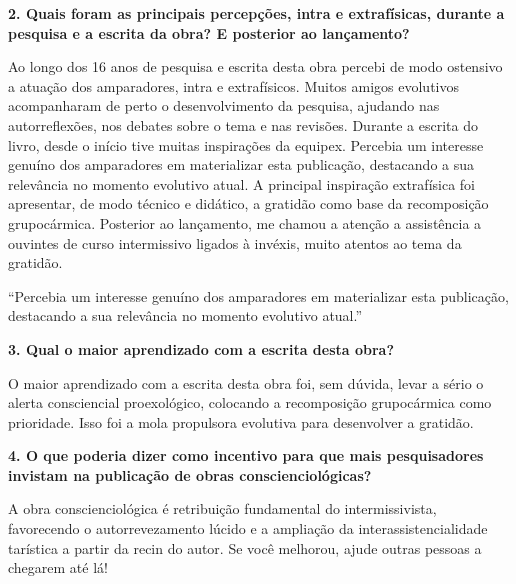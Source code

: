 \documentclass{gescons}
\begin{document}
\begin{multicols}{2}
\textbf{2. Quais foram as principais percepções, intra e extrafísicas, durante a pesquisa e a escrita da obra? E posterior ao lançamento?}

Ao longo dos 16 anos de pesquisa e escrita desta obra percebi de modo ostensivo a atuação dos amparadores, intra e extrafísicos. Muitos amigos evolutivos acompanharam de perto o desenvolvimento da pesquisa, ajudando nas autorreflexões, nos debates sobre o tema e nas revisões. Durante a escrita do livro, desde o início tive muitas inspirações da equipex. Percebia um interesse genuíno dos amparadores em materializar esta publicação, destacando a sua relevância no momento evolutivo atual. A principal inspiração extrafísica foi apresentar, de modo técnico e didático, a gratidão como base da recomposição grupocármica. Posterior ao lançamento, me chamou a atenção a assistência a ouvintes de curso intermissivo ligados à invéxis, muito atentos ao tema da gratidão.

\begin{pullquote}
``Percebia um interesse genuíno dos amparadores em materializar esta publicação, destacando a sua relevância no momento evolutivo atual.''
\end{pullquote}

\textbf{3. Qual o maior aprendizado com a escrita desta obra?}

O maior aprendizado com a escrita desta obra foi, sem dúvida, levar a sério o alerta consciencial proexológico, colocando a recomposição grupocármica como prioridade. Isso foi a mola propulsora evolutiva para desenvolver a gratidão. 

\textbf{4. O que poderia dizer como incentivo para que mais pesquisadores invistam na publicação de obras conscienciológicas?}

A obra conscienciológica é retribuição fundamental do intermissivista, favorecendo o autorrevezamento lúcido e a ampliação da interassistencialidade tarística a partir da recin do autor. Se você melhorou, ajude outras pessoas a chegarem até lá! 
    
    
    \end{multicols}
\end{document}
